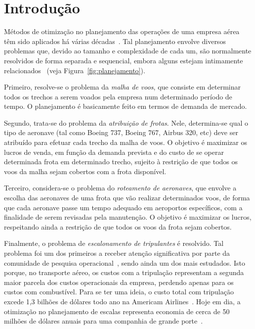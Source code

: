 \zerar
\chapter{Introdução}
\label{cap:introducao}

Métodos de otimização no planejamento das operações de uma empresa aérea têm sido aplicados há
várias décadas~\cite{yu}. Tal planejamento envolve diversos problemas que, devido ao tamanho e
complexidade de cada um, são normalmente resolvidos de forma separada e sequencial, embora alguns
estejam intimamente relacionados~\cite{barnhart03} (veja Figura~\ref{fig:planejamento}).

Primeiro, resolve-se o problema da \emph{malha de voos}, que consiste em determinar todos os trechos
a serem voados pela empresa num determinado período de tempo. O planejamento é basicamente feito em
termos de demanda de mercado.

Segundo, trata-se do problema da \emph{atribuição de frotas}. Nele, determina-se qual o tipo de
aeronave (tal como Boeing 737, Boeing 767, Airbus 320, etc) deve ser atribuído para efetuar cada
trecho da malha de voos. O objetivo é maximizar os lucros de venda, em função da demanda prevista e
do custo de se operar determinada frota em determinado trecho, sujeito à restrição de que todos os
voos da malha sejam cobertos com a frota disponível.

Terceiro, considera-se o problema do \emph{roteamento de aeronaves}, que envolve a escolha das
aeronaves de uma frota que vão realizar determinados voos, de forma que cada aeronave passe um tempo
adequado em aeroportos específicos, com a finalidade de serem revisadas pela manutenção. O objetivo
é maximizar os lucros, respeitando ainda a restrição de que todos os voos da frota sejam cobertos.

Finalmente, o problema de \emph{escalonamento de tripulantes} é resolvido. Tal problema foi um dos
primeiros a receber atenção significativa por parte da comunidade de pesquisa
operacional~\cite{arabeyre69}, sendo ainda um dos mais estudados. Isto porque, no transporte aéreo,
os custos com a tripulação representam a segunda maior parcela dos custos operacionais da empresa,
perdendo apenas para os custos com combustível. Para se ter uma ideia, o custo total com tripulação
excede 1,3 bilhões de dólares todo ano na Americam Airlines~\cite{anbil91a}. Hoje em dia, a
otimização no planejamento de escalas representa economia de cerca de 50 milhões de dólares anuais
para uma companhia de grande porte~\cite{barnhart03}.

